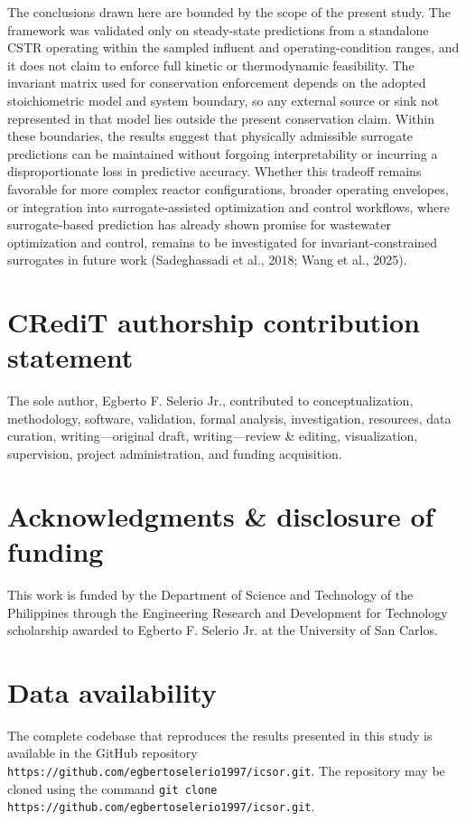 \documentclass[a4paper,fleqn]{cas-sc}
\newenvironment{revblock}{\begingroup\color{revDefault}}{\endgroup}
\begin{document}
\begin{revblock}
The conclusions drawn here are bounded by the scope of the present study. The framework was validated only on steady-state predictions from a standalone CSTR operating within the sampled influent and operating-condition ranges, and it does not claim to enforce full kinetic or thermodynamic feasibility. The invariant matrix used for conservation enforcement depends on the adopted stoichiometric model and system boundary, so any external source or sink not represented in that model lies outside the present conservation claim. Within these boundaries, the results suggest that physically admissible surrogate predictions can be maintained without forgoing interpretability or incurring a disproportionate loss in predictive accuracy. Whether this tradeoff remains favorable for more complex reactor configurations, broader operating envelopes, or integration into surrogate-assisted optimization and control workflows, where surrogate-based prediction has already shown promise for wastewater optimization and control, remains to be investigated for invariant-constrained surrogates in future work (Sadeghassadi et al., 2018; Wang et al., 2025).
\end{revblock}

\section*{CRediT authorship contribution statement}

The sole author, Egberto F. Selerio Jr., contributed to conceptualization, methodology, software, validation, formal analysis, investigation, resources, data curation, writing---original draft, writing---review \& editing, visualization, supervision, project administration, and funding acquisition.

\section*{Acknowledgments \& disclosure of funding}

This work is funded by the Department of Science and Technology of the Philippines through the Engineering Research and Development for Technology scholarship awarded to Egberto F. Selerio Jr. at the University of San Carlos.

\section*{Data availability}

The complete codebase that reproduces the results presented in this study is available in the GitHub repository \texttt{https://github.com/egbertoselerio1997/icsor.git}. The repository may be cloned using the command \texttt{git clone https://github.com/egbertoselerio1997/icsor.git}.
\end{document}
